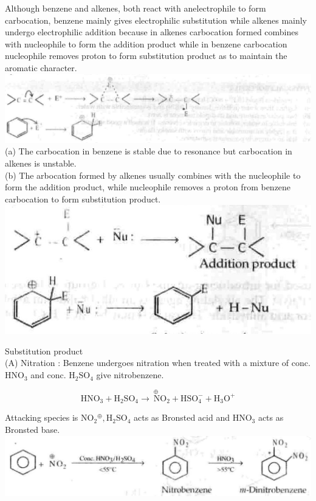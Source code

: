 \documentclass[10pt]{article}
\begin{document}
Although benzene and alkenes, both react with anelectrophile to form carbocation, benzene mainly gives electrophilic substitution while alkenes mainly undergo electrophilic addition because in alkenes carbocation formed combines with nucleophile to form the addition product while in benzene carbocation nucleophile removes proton to form substitution product as to maintain the aromatic character.\\
\includegraphics[max width=\textwidth, center]{2025_01_28_8470952b98110cec3aabg-206(3)}\\
(a) The carbocation in benzene is stable due to resonance but carbocation in alkenes is unstable.\\
(b) The arbocation formed by alkenes usually combines with the nucleophile to form the addition product, while nucleophile removes a proton from benzene carbocation to form substitution product.\\
\includegraphics[max width=\textwidth, center]{2025_01_28_8470952b98110cec3aabg-207(1)}

Substitution product\\
(A) Nitration : Benzene undergoes nitration when treated with a mixture of conc. $\mathrm{HNO}_{3}$ and conc. $\mathrm{H}_{2} \mathrm{SO}_{4}$ give nitrobenzene.

$$
\mathrm{HNO}_{3}+\mathrm{H}_{2} \mathrm{SO}_{4} \longrightarrow \stackrel{\oplus}{\mathrm{~N}} \mathrm{O}_{2}+\mathrm{HSO}_{4}^{-}+\mathrm{H}_{3} \mathrm{O}^{+}
$$

Attacking species is $\mathrm{NO}_{2}{ }^{\oplus}, \mathrm{H}_{2} \mathrm{SO}_{4}$ acts as Bronsted acid and $\mathrm{HNO}_{3}$ acts as Bronsted base.\\
\includegraphics[max width=\textwidth, center]{2025_01_28_8470952b98110cec3aabg-207(5)}
\end{document}
